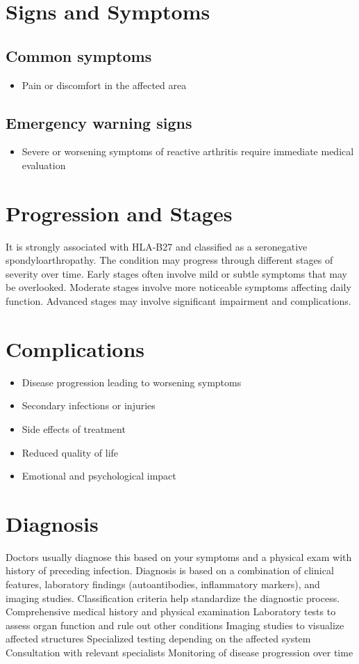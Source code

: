 \section{Signs and Symptoms}

\subsection{Common symptoms}
\begin{itemize}[noitemsep]
  \item Pain or discomfort in the affected area
  \end{itemize}

\subsection{Emergency warning signs}
\begin{itemize}[noitemsep]
  \item Severe or worsening symptoms of reactive arthritis require immediate medical evaluation
\end{itemize}
\section{Progression and Stages}
It is strongly associated with HLA-B27 and classified as a seronegative spondyloarthropathy. The condition may progress through different stages of severity over time. Early stages often involve mild or subtle symptoms that may be overlooked. Moderate stages involve more noticeable symptoms affecting daily function. Advanced stages may involve significant impairment and complications.
\section{Complications}
\begin{itemize}[noitemsep]
  \item Disease progression leading to worsening symptoms
  \item Secondary infections or injuries
  \item Side effects of treatment
  \item Reduced quality of life
  \item Emotional and psychological impact
\end{itemize}
\section{Diagnosis}
Doctors usually diagnose this based on your symptoms and a physical exam with history of preceding infection. Diagnosis is based on a combination of clinical features, laboratory findings (autoantibodies, inflammatory markers), and imaging studies. Classification criteria help standardize the diagnostic process. Comprehensive medical history and physical examination Laboratory tests to assess organ function and rule out other conditions Imaging studies to visualize affected structures Specialized testing depending on the affected system Consultation with relevant specialists Monitoring of disease progression over time

